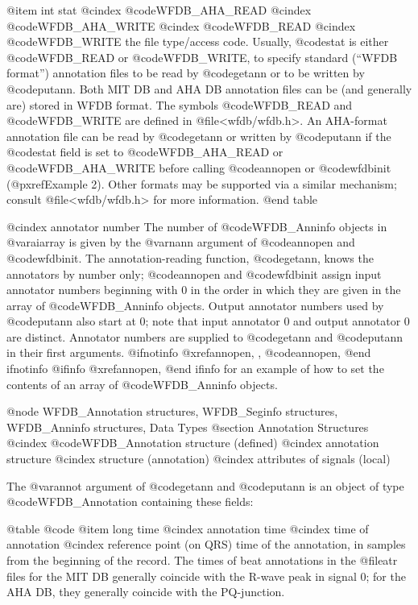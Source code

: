 {{{{{{{{{@item int stat
@cindex @code{WFDB_AHA_READ}
@cindex @code{WFDB_AHA_WRITE}
@cindex @code{WFDB_READ}
@cindex @code{WFDB_WRITE}
the file type/access code.  Usually, @code{stat} is either
@code{WFDB_READ} or @code{WFDB_WRITE}, to specify standard (``WFDB
format'') annotation files to be read by @code{getann} or to be
written by @code{putann}.  Both MIT DB and AHA DB annotation files can
be (and generally are) stored in WFDB format.  The symbols
@code{WFDB_READ} and @code{WFDB_WRITE} are defined in
@file{<wfdb/wfdb.h>}. An AHA-format annotation file can be read by
@code{getann} or written by @code{putann} if the @code{stat} field is
set to @code{WFDB_AHA_READ} or @code{WFDB_AHA_WRITE} before calling
@code{annopen} or @code{wfdbinit} (@pxref{Example 2}).  Other formats
may be supported via a similar mechanism; consult @file{<wfdb/wfdb.h>}
for more information.
@end table

@cindex annotator number
The number of @code{WFDB_Anninfo} objects in @var{aiarray} is given by
the @var{nann} argument of @code{annopen} and @code{wfdbinit}.  The
annotation-reading function, @code{getann}, knows the annotators by
number only; @code{annopen} and @code{wfdbinit} assign input annotator
numbers beginning with 0 in the order in which they are given in the
array of @code{WFDB_Anninfo} objects.  Output annotator numbers used by
@code{putann} also start at 0; note that input annotator 0 and output
annotator 0 are distinct.  Annotator numbers are supplied to
@code{getann} and @code{putann} in their first arguments.
@ifnotinfo
@xref{annopen, , @code{annopen}},
@end ifnotinfo
@ifinfo
@xref{annopen},
@end ifinfo
for an example of how to set the contents of an array of @code{WFDB_Anninfo}
objects.

@node WFDB_Annotation structures, WFDB_Seginfo structures, WFDB_Anninfo structures, Data Types
@section Annotation Structures
@cindex @code{WFDB_Annotation} structure (defined)
@cindex annotation structure
@cindex structure (annotation)
@cindex attributes of signals (local)

The @var{annot} argument of @code{getann} and @code{putann} is an
object of type @code{WFDB_Annotation} containing these fields:

@table @code
@item long time
@cindex annotation time
@cindex time of annotation
@cindex reference point (on QRS)
time of the annotation, in samples from the beginning of the record.
The times of beat annotations in the @file{atr} files for the MIT DB
generally coincide with the R-wave peak in signal 0; for the AHA DB,
they generally coincide with the PQ-junction.

}}}}}}}}}
